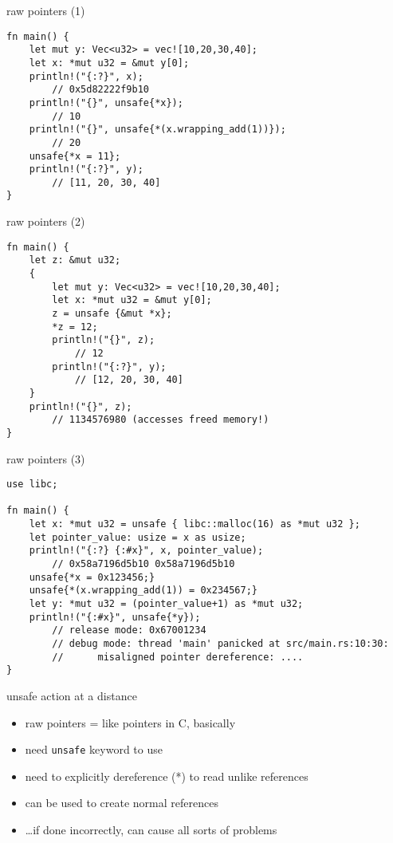 \begin{frame}[fragile]{raw pointers (1)}
\begin{verbatim}
fn main() {
    let mut y: Vec<u32> = vec![10,20,30,40];
    let x: *mut u32 = &mut y[0];
    println!("{:?}", x);
        // 0x5d82222f9b10
    println!("{}", unsafe{*x});
        // 10
    println!("{}", unsafe{*(x.wrapping_add(1))});
        // 20
    unsafe{*x = 11};
    println!("{:?}", y);
        // [11, 20, 30, 40]
}
\end{verbatim}
\end{frame}

\begin{frame}[fragile]{raw pointers (2)}
\begin{verbatim}
fn main() {
    let z: &mut u32;
    {
        let mut y: Vec<u32> = vec![10,20,30,40];
        let x: *mut u32 = &mut y[0];
        z = unsafe {&mut *x};
        *z = 12;
        println!("{}", z);
            // 12
        println!("{:?}", y);
            // [12, 20, 30, 40]
    }
    println!("{}", z);
        // 1134576980 (accesses freed memory!)
}
\end{verbatim}
\end{frame}

\begin{frame}[fragile]{raw pointers (3)}
\begin{verbatim}
use libc;

fn main() {
    let x: *mut u32 = unsafe { libc::malloc(16) as *mut u32 };
    let pointer_value: usize = x as usize;
    println!("{:?} {:#x}", x, pointer_value);
        // 0x58a7196d5b10 0x58a7196d5b10
    unsafe{*x = 0x123456;}
    unsafe{*(x.wrapping_add(1)) = 0x234567;}
    let y: *mut u32 = (pointer_value+1) as *mut u32;
    println!("{:#x}", unsafe{*y});
        // release mode: 0x67001234
        // debug mode: thread 'main' panicked at src/main.rs:10:30:
        //      misaligned pointer dereference: ....
}
\end{verbatim}
\end{frame}

\begin{frame}{unsafe action at a distance}
    \begin{itemize}
    \item raw pointers = like pointers in C, basically
    \item need \texttt{unsafe} keyword to use
    \item need to explicitly dereference (*) to read unlike references
    \vspace{.5cm}
    \item can be used to create normal references
    \item \ldots if done incorrectly, can cause all sorts of problems
    \end{itemize}
\end{frame}
